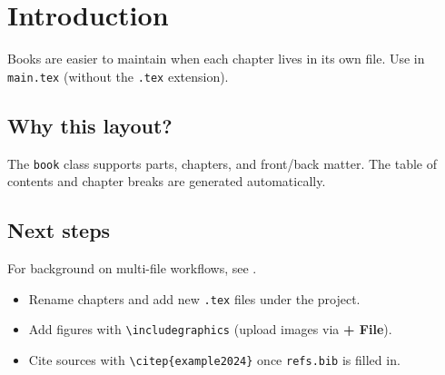 \chapter{Introduction}
\label{ch:intro}

Books are easier to maintain when each chapter lives in its own file.
Use \verb|| in \texttt{main.tex} (without the \texttt{.tex} extension).

\section{Why this layout?}
The \texttt{book} class supports parts, chapters, and front/back matter.
The table of contents and chapter breaks are generated automatically.

\section{Next steps}
For background on multi-file workflows, see \citep{exampleArticle2024}.
\begin{itemize}
  \item Rename chapters and add new \texttt{.tex} files under the project.
  \item Add figures with \verb|\includegraphics| (upload images via \textbf{+ File}).
  \item Cite sources with \verb|\citep{example2024}| once \texttt{refs.bib} is filled in.
\end{itemize}
